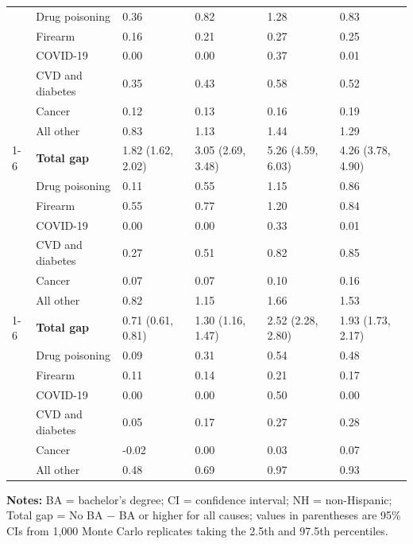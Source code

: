\begin{threeparttable}
\begin{tabular}{llllll}
 & Drug poisoning & 0.36 & 0.82 & 1.28 & 0.83 \\
 & Firearm & 0.16 & 0.21 & 0.27 & 0.25 \\
 & COVID-19 & 0.00 & 0.00 & 0.37 & 0.01 \\
 & CVD and diabetes & 0.35 & 0.43 & 0.58 & 0.52 \\
 & Cancer & 0.12 & 0.13 & 0.16 & 0.19 \\
 & All other & 0.83 & 1.13 & 1.44 & 1.29 \\
\cmidrule(lr){1-6}
\multirow{7}{*}{NH Black} & \textbf{Total gap} & 1.82 (1.62, 2.02) & 3.05 (2.69, 3.48) & 5.26 (4.59, 6.03) & 4.26 (3.78, 4.90) \\
 & Drug poisoning & 0.11 & 0.55 & 1.15 & 0.86 \\
 & Firearm & 0.55 & 0.77 & 1.20 & 0.84 \\
 & COVID-19 & 0.00 & 0.00 & 0.33 & 0.01 \\
 & CVD and diabetes & 0.27 & 0.51 & 0.82 & 0.85 \\
 & Cancer & 0.07 & 0.07 & 0.10 & 0.16 \\
 & All other & 0.82 & 1.15 & 1.66 & 1.53 \\
\cmidrule(lr){1-6}
\multirow{7}{*}{Hispanic} & \textbf{Total gap} & 0.71 (0.61, 0.81) & 1.30 (1.16, 1.47) & 2.52 (2.28, 2.80) & 1.93 (1.73, 2.17) \\
 & Drug poisoning & 0.09 & 0.31 & 0.54 & 0.48 \\
 & Firearm & 0.11 & 0.14 & 0.21 & 0.17 \\
 & COVID-19 & 0.00 & 0.00 & 0.50 & 0.00 \\
 & CVD and diabetes & 0.05 & 0.17 & 0.27 & 0.28 \\
 & Cancer & -0.02 & 0.00 & 0.03 & 0.07 \\
 & All other & 0.48 & 0.69 & 0.97 & 0.93 \\
\bottomrule
\end{tabular}
\begin{tablenotes}[flushleft]
\small
\item \textbf{Notes:} BA = bachelor's degree; CI = confidence interval; NH = non-Hispanic; Total gap = No BA $-$ BA or higher for all causes; values in parentheses are 95\% CIs from 1,000 Monte Carlo replicates taking the 2.5th and 97.5th percentiles.
\end{tablenotes}
\end{threeparttable}
